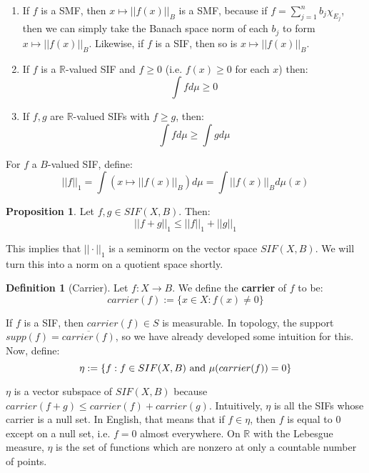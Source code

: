 \documentclass[11pt, oneside]{amsart}   	%
\theoremstyle{definition}
\newtheorem{definition}{Definition}[section]
\newtheorem{prop}{Proposition}[section]
\begin{document}
	\begin{enumerate}
		\item If $f$ is a SMF, then $x\mapsto ||f(x)||_B$ is a SMF, because if $f = \sum_{j = 1}^n b_j\chi_{E_j}$, then 
		we can simply take the Banach space norm of each $b_j$ to form $x\mapsto ||f(x)||_B$. Likewise, if $f$ is a 
		SIF, then so is $x\mapsto ||f(x)||_B$.
		
		\item If $f$ is a $\mathbb R$-valued SIF and $f\geq 0$ (i.e. $f(x)\geq 0$ for each $x$) then:
		$$
			\int fd\mu\geq 0
		$$
		
		\item If $f, g$ are $\mathbb R$-valued SIFs with $f\geq g$, then:
		$$
			\int fd\mu\geq\int gd\mu
		$$
	\end{enumerate}
	
	For $f$ a $B$-valued SIF, define:
	$$
		||f||_1 = \int (x\mapsto ||f(x)||_B)d\mu = \int ||f(x)||_Bd\mu(x)
	$$
	\begin{prop}
		Let $f, g\in SIF(X, B)$. Then:
		$$
			||f + g||_1\leq ||f||_1 + ||g||_1
		$$
	\end{prop}
	This implies that $||\cdot||_1$ is a seminorm on the vector space $SIF(X, B)$. We will turn this into a norm on a 
	quotient space shortly. 
	
	\begin{definition}[Carrier]
		Let $f : X\rightarrow B$. We define the \textbf{carrier} of $f$ to be:
		$$
			carrier(f) := \{x\in X : f(x)\neq 0\}
		$$
	\end{definition}
	
	If $f$ is a SIF, then $carrier(f)\in S$ is measurable. In topology, the support $supp(f) = \overline{carrier(f)}$, so we 
	have already developed some intuition for this. Now, define:
	$$
		\eta := \{f : f\in SIF(X, B)\textnormal{ and } \mu(carrier(f)) = 0\}
	$$
	
	$\eta$ is a vector subspace of $SIF(X, B)$ because $carrier(f + g)\leq carrier(f) + carrier(g)$. Intuitively, $\eta$ is 
	all the SIFs whose carrier is a null set. In English, that means that if $f\in\eta$, then $f$ is equal to $0$ except 
	on a null set, i.e. $f = 0$ almost everywhere. On $\mathbb R$ with the Lebesgue measure, $\eta$ is the set of functions 
	which are nonzero at only a countable number of points. 
	
\end{document}
